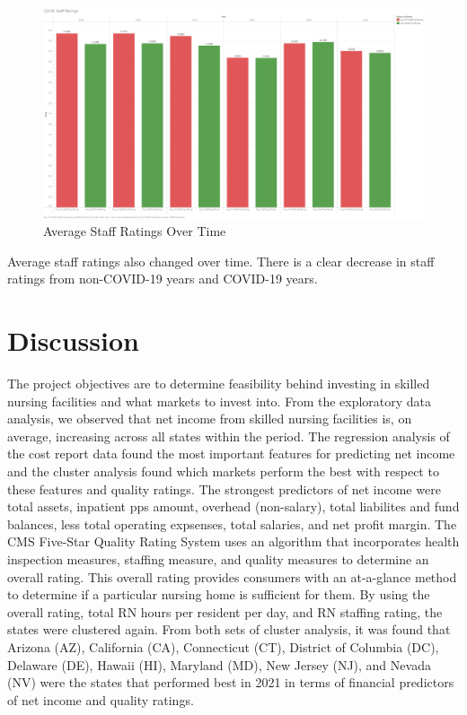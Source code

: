 \documentclass{article}
\theoremstyle{mytheoremstyle}
\theoremstyle{mytheoremstyle}
\theoremstyle{myproblemstyle}
\begin{document}
\pagebreak
\begin{figure}[htbp]
\centering
\includegraphics[width=\linewidth]{Images/COVID Staff Ratings.png}
\caption{Average Staff Ratings Over Time}
\label{ratings over time}
\end{figure}

\noindent Average staff ratings also changed over time. There is a clear decrease in staff ratings from non-COVID-19 years and COVID-19 years. 




\pagebreak

\section{Discussion}
The project objectives are to determine feasibility behind investing in skilled nursing facilities and what markets to invest into. From the exploratory data analysis, we observed that net income from skilled nursing facilities is, on average, increasing across all states within the period. The regression analysis of the cost report data found the most important features for predicting net income and the cluster analysis found which markets perform the best with respect to these features and quality ratings. The strongest predictors of net income were total assets, inpatient pps amount, overhead (non-salary), total liabilites and fund balances, less total operating expsenses, total salaries, and net profit margin. The CMS Five-Star Quality Rating System uses an algorithm that incorporates health inspection measures, staffing measure, and quality measures to determine an overall rating. This overall rating provides consumers with an at-a-glance method to determine if a particular nursing home is sufficient for them. By using the overall rating, total RN hours per resident per day, and RN staffing rating, the states were clustered again. From both sets of cluster analysis, it was found that Arizona (AZ), California (CA), Connecticut (CT), District of Columbia (DC), Delaware (DE), Hawaii (HI), Maryland (MD), New Jersey (NJ), and Nevada (NV) were the states that performed best in 2021 in terms of financial predictors of net income and quality ratings. 
\end{document}
